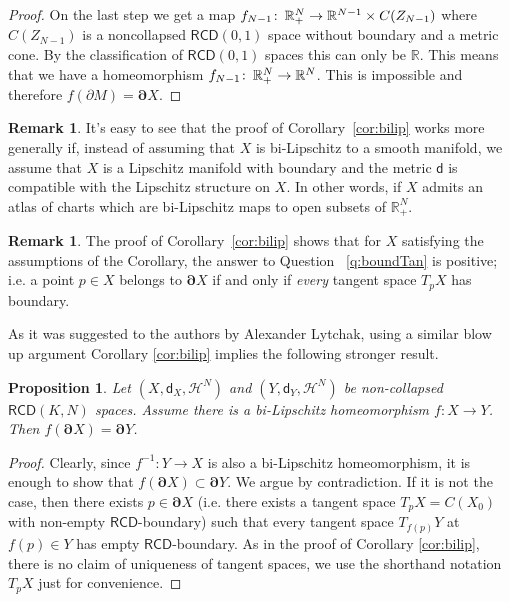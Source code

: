\documentclass[a4paper]{amsart}
\newcounter{assu}
\theoremstyle{plain}
\newtheorem{proposition}[lemma]{Proposition}
\theoremstyle{definition}
\newtheorem{remark}[lemma]{Remark}
\numberwithin{equation}{section}
\newcommand{\R}{\mathbb{R}}
\newcommand{\RCD}{\mathsf{RCD}}
\newcommand{\sfd}{\mathsf d}
\newcommand{\cH}{\mathcal{H}}
\def\co{\colon\thinspace}
\newcommand{\bRCD}{\boldsymbol\partial}
\begin{document}
{{\begin{proof}
 On the last step  we get a map  $f_{N-1}\co \R^N_+\to \R^{N-1}\times C(Z_{N-1})$ where $C(Z_{N-1})$ is a noncollapsed  $\RCD(0,1)$ space without boundary and a metric cone. By the classification of $\RCD(0,1)$ spaces this can only be $\R$. This means that we have a homeomorphism $f_{N-1}\co \R^N_+\to \R^{N}$. This is  impossible and therefore $f(\partial M)=\bRCD X$.
\end{proof}


\begin{remark}
It's easy to see that the proof of Corollary~\ref{cor:bilip} works more generally if, instead of assuming that $X$ is bi-Lipschitz to a smooth manifold, we assume that $X$ is a Lipschitz manifold with boundary and the metric $\sfd$ is compatible with the Lipschitz structure on $X$. In other words, if $X$ admits an atlas of charts which are bi-Lipschitz maps to open subsets of $\R^N_+$.
\end{remark}


\begin{remark}
The proof of Corollary~\ref{cor:bilip} shows that for $X$ satisfying the assumptions of the Corollary, the answer to Question ~\ref{q:boundTan} is positive; i.e. a point $p\in X$ belongs to $\bRCD X$ if and only if \emph{every} tangent space $T_pX$ has  boundary.
\end{remark}




As it was  suggested  to the authors by Alexander Lytchak,  using a similar blow up argument Corollary \ref{cor:bilip}   implies the following stronger result.

\begin{proposition}\label{bilip-preserve-bry}
Let $(X,\sfd_{X},\cH^{N})$ and  $(Y,\sfd_{Y},\cH^{N})$ be non-collapsed  $\RCD(K,N)$ spaces. Assume there is a bi-Lipschitz homeomorphism $f:X\to Y$. Then $f(\bRCD X)=\bRCD Y$.
\end{proposition}

\begin{proof}
Clearly, since $f^{-1}:Y\to X$ is also a bi-Lipschitz homeomorphism, it is enough to show that $f(\bRCD X)\subset \bRCD Y$. We argue by contradiction. If it is not the case, then there exists  $p\in \bRCD X$ (i.e. there exists a tangent space $T_{p}X=C(X_0)$ with non-empty $\RCD$-boundary) such that  every tangent space $T_{f(p)} Y$ at $f(p)\in Y$ has empty $\RCD$-boundary. As in the proof of Corollary \ref{cor:bilip}, there is no claim of uniqueness of tangent  { spaces}, we use the shorthand notation $T_{p}X$ just for convenience.


\end{proof}}}
\end{document}
